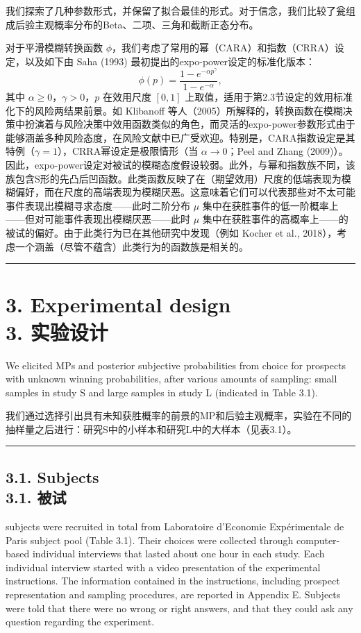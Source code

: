 \documentclass[12pt,a4paper]{article}
\newenvironment{original}
  {\par\vspace{0.5em}\noindent\color{black}\ignorespaces}
  {\par\vspace{0.3em}}
\newenvironment{translation}
  {\par\noindent\color{transblue}\ignorespaces}
  {\par\vspace{0.8em}\hrule\vspace{0.5em}}
\newcommand{\bilingualsection}[2]{%
  \section{\texorpdfstring{#1 \\[0.3em] {\large\color{transblue}#2}}{#1}}
}
\newcommand{\bilingualsubsection}[2]{%
  \subsection{\texorpdfstring{#1 \\[0.2em] {\normalsize\color{transblue}#2}}{#1}}
}
\begin{document}
\begin{translation}
我们探索了几种参数形式，并保留了拟合最佳的形式。对于信念，我们比较了瓮组成后验主观概率分布的Beta、二项、三角和截断正态分布。

对于平滑模糊转换函数 $\phi$，我们考虑了常用的幂（CARA）和指数（CRRA）设定，以及如下由 Saha (1993) 最初提出的expo-power设定的标准化版本：
\begin{equation}
\phi(p) = \frac{1 - e^{-\alpha p^\gamma}}{1 - e^{-\alpha}},
\end{equation}
其中 $\alpha \geq 0$，$\gamma > 0$，$p$ 在效用尺度 $[0, 1]$ 上取值，适用于第2.3节设定的效用标准化下的风险两结果前景。如 Klibanoff 等人（2005）所解释的，转换函数在模糊决策中扮演着与风险决策中效用函数类似的角色，而灵活的expo-power参数形式由于能够涵盖多种风险态度，在风险文献中已广受欢迎。特别是，CARA指数设定是其特例（$\gamma = 1$），CRRA幂设定是极限情形（当 $\alpha \to 0$；Peel and Zhang (2009)）。因此，expo-power设定对被试的模糊态度假设较弱。此外，与幂和指数族不同，该族包含S形的先凸后凹函数。此类函数反映了在（期望效用）尺度的低端表现为模糊偏好，而在尺度的高端表现为模糊厌恶。这意味着它们可以代表那些对不太可能事件表现出模糊寻求态度——此时二阶分布 $\mu$ 集中在获胜事件的低一阶概率上——但对可能事件表现出模糊厌恶——此时 $\mu$ 集中在获胜事件的高概率上——的被试的偏好。由于此类行为已在其他研究中发现（例如 Kocher et al., 2018），考虑一个涵盖（尽管不蕴含）此类行为的函数族是相关的。
\end{translation}
\bilingualsection{3. Experimental design}{3. 实验设计}

\begin{original}
We elicited MPs and posterior subjective probabilities from choice for prospects with unknown winning probabilities, after various amounts of sampling: small samples in study S and large samples in study L (indicated in Table 3.1).
\end{original}

\begin{translation}
我们通过选择引出具有未知获胜概率的前景的MP和后验主观概率，实验在不同的抽样量之后进行：研究S中的小样本和研究L中的大样本（见表3.1）。
\end{translation}

\bilingualsubsection{3.1. Subjects}{3.1. 被试}

\begin{original}
140 subjects were recruited in total from Laboratoire d'Economie Exp\'{e}rimentale de Paris subject pool (Table 3.1). Their choices were collected through computer-based individual interviews that lasted about one hour in each study. Each individual interview started with a video presentation of the experimental instructions. The information contained in the instructions, including prospect representation and sampling procedures, are reported in Appendix E. Subjects were told that there were no wrong or right answers, and that they could ask any question regarding the experiment.
\end{original}
\end{document}
